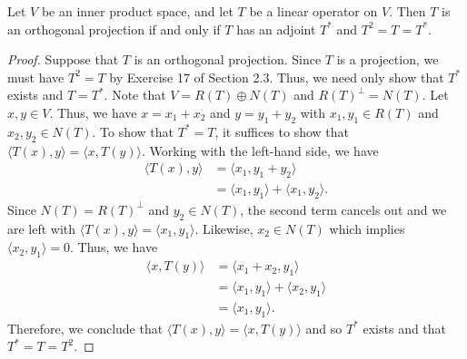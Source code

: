 \begin{theorem}
    Let \( V  \) be an inner product space, and let \( T  \) be a linear operator on \( V  \). Then \( T  \) is an orthogonal projection if and only if \( T  \) has an adjoint \( T^{*} \) and \( T^{2} = T = T^{*} \).
\end{theorem}

\begin{proof}
Suppose that \( T  \) is an orthogonal projection. Since \( T  \) is a projection, we must have \( T^{2} = T  \) by Exercise 17 of Section 2.3. Thus, we need only show that \( T^{*} \) exists and \( T = T^{*} \). Note that \( V = R(T) \oplus N(T) \) and \( R(T)^{\perp} = N(T) \). Let \( x,y \in V  \). Thus, we have \( x = {x}_{1} + {x}_{2}  \) and \( y = {y}_{1} + {y}_{2} \) with \( {x}_{1}, {y}_{1} \in R(T) \) and \( {x}_{2}, {y}_{2} \in N(T) \). To show that \( T^{*} = T  \), it suffices to show that \( \langle T(x) , y \rangle =  \langle x , T(y) \rangle \). Working with the left-hand side, we have
\begin{align*}
    \langle T(x) , y \rangle &= \langle {x}_{1}  , {y}_{1} + {y}_{2} \rangle  \\
                             &=  \langle {x}_{1} ,  {y}_{1} \rangle + \langle {x}_{1}  ,  {y}_{2} \rangle. 
\end{align*}
Since \( N(T) = R(T)^{\perp} \) and \( {y}_{2} \in N(T) \), the second term cancels out and we are left with \( \langle T(x) , y \rangle = \langle {x}_{1} , {y}_{1} \rangle \). Likewise, \( {x}_{2} \in N(T)   \) which implies \( \langle {x}_{2} , {y}_{1} \rangle = 0  \). Thus, we have
\begin{align*}
    \langle x , T(y) \rangle &= \langle {x}_{1} + {x}_{2} ,  {y}_{1} \rangle \\
                             &= \langle {x}_{1} ,  {y}_{1} \rangle + \langle {x}_{2}  , {y}_{1} \rangle \\
                             &= \langle {x}_{1} , {y}_{1} \rangle.
\end{align*}
Therefore, we conclude that \( \langle T(x) , y \rangle = \langle x  , T(y) \rangle \) and so \( T^{*} \) exists and that \( T^{*} = T = T^{2}  \).


\end{proof}
